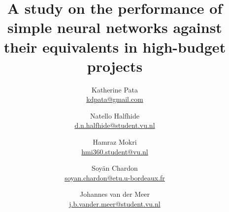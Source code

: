 \documentclass[11pt, a4paper]{article}
\begin{document}
\title{A study on the performance of simple neural networks against their equivalents in high-budget projects}
\author{
  Katherine Pata \\ \href{mailto:kdpata@gmail.com}{kdpata@gmail.com}
  \and Natello Halfhide \\ \href{mailto:d.n.halfhide@student.vu.nl}{d.n.halfhide@student.vu.nl}
  \and Hamraz Mokri \\ \href{mailto:hmi360.student@vu.nl}{hmi360.student@vu.nl}
  \and Soyän Chardon \\ \href{mailto:soyan.chardon@etu.u-bordeaux.fr}{soyan.chardon@etu.u-bordeaux.fr}
  \and Johannes van der Meer \\ \href{mailto:j.b.vander.meer@student.vu.nl}{j.b.vander.meer@student.vu.nl}
}
\maketitle

\newpage

\tableofcontents

\newpage
\restoregeometry

\twocolumn











\newpage
\onecolumn
\appendix
\end{document}
